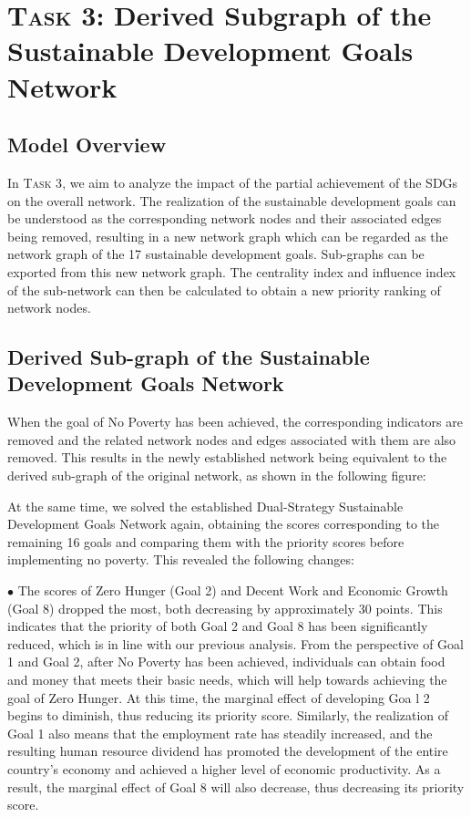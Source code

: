 \documentclass[12pt]{article}  %
\begin{document}
\section{\textsc{Task 3:} Derived Subgraph of the Sustainable Development Goals Network}
\subsection{Model Overview}

In \textsc{Task 3}, we aim to analyze the impact of the partial achievement of the SDGs on the overall network. The realization of the sustainable development goals can be understood as the corresponding network nodes and their associated edges being removed, resulting in a new network graph which can be regarded as the network graph of the 17 sustainable development goals. Sub-graphs can be exported from this new network graph. The centrality index and influence index of the sub-network can then be calculated to obtain a new priority ranking of network nodes.
\subsection{Derived Sub-graph of the Sustainable Development Goals Network}
When the goal of No Poverty has been achieved, the corresponding indicators are removed and the related network nodes and edges associated with them are also removed. This results in the newly established network being equivalent to the derived sub-graph of the original network, as shown in the following figure:


At the same time, we solved the established Dual-Strategy Sustainable Development Goals Network again, obtaining the scores corresponding to the remaining 16 goals and comparing them with the priority scores before implementing no poverty. This revealed the following changes:

$\bullet$
The scores of Zero Hunger (Goal 2) and Decent Work and Economic Growth (Goal 8) dropped the most, both decreasing by approximately 30 points. This indicates that the priority of both Goal 2 and Goal 8 has been significantly reduced, which is in line with our previous analysis.
From the perspective of Goal 1 and Goal 2, after No Poverty has been achieved, individuals can obtain food and money that meets their basic needs, which will help towards achieving the goal of Zero Hunger. At this time, the marginal effect of developing Goa l 2 begins to diminish, thus reducing its priority score. Similarly, the realization of Goal 1 also means that the employment rate has steadily increased, and the resulting human resource dividend has promoted the development of the entire country's economy and achieved a higher level of economic productivity. As a result, the marginal effect of Goal 8 will also decrease, thus decreasing its priority score.
\end{document}
